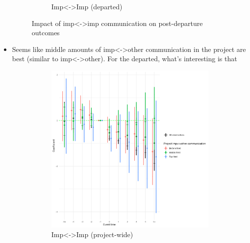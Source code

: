 \documentclass[12pt,notitlepage]{article}
\begin{document}
\begin{itemize}
\begin{figure}[hp]
\begin{subfigure}[b]{0.48\textwidth}
    \caption{Imp<->Imp (departed)}
  \end{subfigure}
  \caption{Impact of imp<->imp communication on post-departure outcomes}
\end{figure}
    \item Seems like middle amounts of imp<->other communication in the project are best (similar to imp<->other). For the departed, what's interesting is that 
\begin{figure}[hp]
  \centering
  \begin{subfigure}[b]{0.48\textwidth}
    \centering
    \includegraphics[width=\textwidth]{temp/imp_other_combined_2p_back_bin_third.png}
    \caption{Imp<->Imp (project-wide)}
  \end{subfigure}
  \hfill
  \begin{subfigure}[b]{0.48\textwidth}
    \centering

\end{subfigure}
\end{figure}
\end{itemize}
\end{document}
